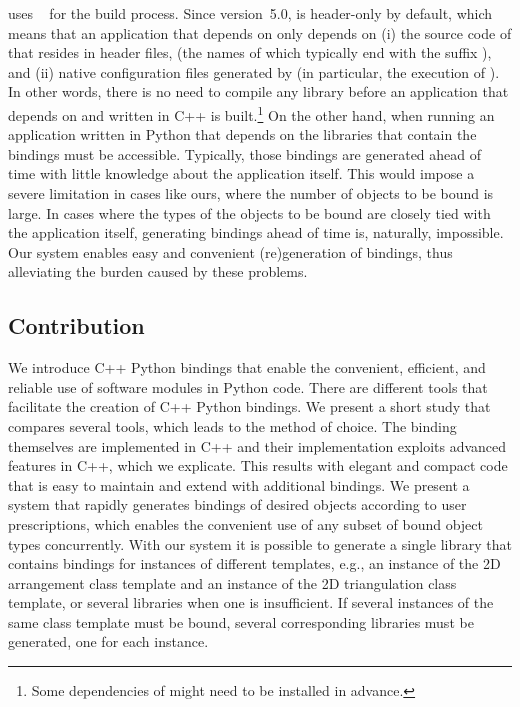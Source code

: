 \cgal{} uses \cmake~\cite{mh-mc-08} for the build process.  Since
version~5.0, \cgal{} is header-only by default, which means that an
application that depends on \cgal{} only depends on (i) the source
code of \cgal{} that resides in header files, (the names of which
typically end with the suffix ), and (ii) native
configuration files generated by \cmake{} (in particular, the
execution of ). In other words, there is no need to
compile any library before an application that depends on \cgal{} and
written in C++ is built.\footnote{Some dependencies of \cgal{} might
  need to be installed in advance.} On the other hand, when running an
application written in Python that depends on \cgal{} the libraries
that contain the bindings must be accessible. Typically, those
bindings are generated ahead of time with little knowledge about the
application itself. This would impose a severe limitation in cases
like ours, where the number of objects to be bound is large. In cases
where the types of the objects to be bound are closely tied with the
application itself, generating bindings ahead of time is, naturally,
impossible. Our system enables easy and convenient (re)generation of
bindings, thus alleviating the burden caused by these problems.

\subsection{Contribution}
\label{ssec:intro:results}
We introduce C++ Python bindings that enable the convenient,
efficient, and reliable use of \cgal{} software modules in Python
code. There are different tools that facilitate the creation of C++
Python bindings. We present a short study that compares several tools,
which leads to the method of choice. The binding themselves are
implemented in C++ and their implementation exploits advanced features
in C++, which we explicate. This results with elegant and compact code
that is easy to maintain and extend with additional bindings.
%
We present a system that rapidly generates bindings of desired
objects according to user prescriptions, which enables the convenient
use of any subset of bound object types concurrently.  With our system
it is possible to generate a single library that contains bindings for
instances of different \cgal{} templates, e.g., an instance of the 2D
arrangement class template and an instance of the 2D triangulation class
template, or several libraries when one is insufficient. If several
instances of the same class template must be bound, several
corresponding libraries must be generated, one for each instance.

